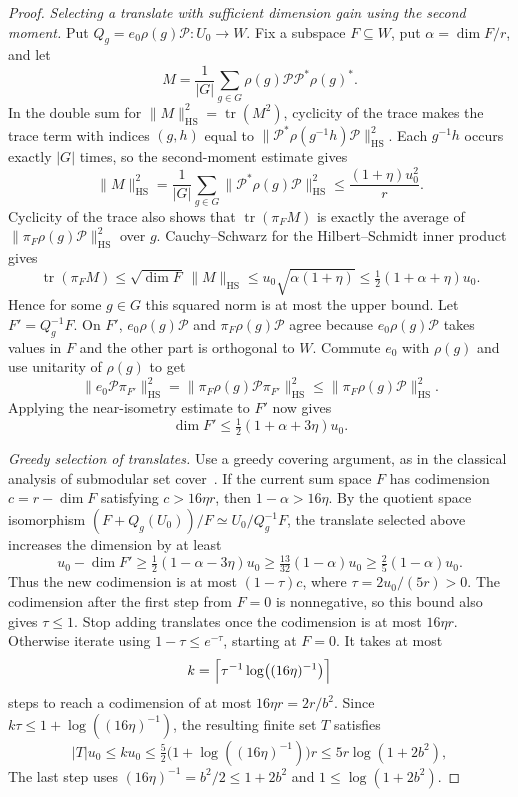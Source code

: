 \begin{proof}
\emph{Selecting a translate with sufficient dimension gain using the second moment.}
Put $Q_g=e_0\rho(g)\mathcal P:U_0\to W$.
Fix a subspace $F\subseteq W$, put $\alpha=\dim F/r$, and let
\[
 M=\frac{1}{|G|}\sum_{g\in G}\rho(g)\mathcal P\mathcal P^*\rho(g)^* .
\]
In the double sum for $\|M\|_{\mathrm{HS}}^2=\operatorname{tr}(M^2)$,
cyclicity of the trace makes the trace term with indices $(g,h)$ equal to
$\|\mathcal P^*\rho(g^{-1}h)\mathcal P\|_{\mathrm{HS}}^2$.
Each $g^{-1}h$ occurs exactly $|G|$ times, so the second-moment estimate gives
\[
 \|M\|_{\mathrm{HS}}^2
 =\frac{1}{|G|}\sum_{g\in G}\|\mathcal P^*\rho(g)\mathcal P\|_{\mathrm{HS}}^2
 \le \frac{(1+\eta)u_0^2}{r}.
\]
Cyclicity of the trace also shows that $\operatorname{tr}(\pi_F M)$ is exactly the average of
$\|\pi_F\rho(g)\mathcal P\|_{\mathrm{HS}}^2$ over $g$.
Cauchy--Schwarz for the Hilbert--Schmidt inner product gives
\[
 \operatorname{tr}(\pi_F M)
 \le \sqrt{\dim F}\,\|M\|_{\mathrm{HS}}
 \le u_0\sqrt{\alpha(1+\eta)}
 \le \tfrac12(1+\alpha+\eta)u_0.
\]
Hence for some $g\in G$ this squared norm is at most the upper bound. Let $F'=Q_g^{-1}F$. On $F'$,
$e_0\rho(g)\mathcal P$ and $\pi_F\rho(g)\mathcal P$ agree
because $e_0\rho(g)\mathcal P$ takes values in $F$ and the other part is orthogonal to $W$.
Commute $e_0$ with $\rho(g)$ and use unitarity of $\rho(g)$ to get
\[
 \|e_0\mathcal P\pi_{F'}\|_{\mathrm{HS}}^2
 =\|\pi_F\rho(g)\mathcal P\pi_{F'}\|_{\mathrm{HS}}^2
 \le\|\pi_F\rho(g)\mathcal P\|_{\mathrm{HS}}^2.
\]
Applying the near-isometry estimate to $F'$ now gives
\[
 \dim F'\le \tfrac12(1+\alpha+3\eta)u_0 .
\]

\emph{Greedy selection of translates.}
Use a greedy covering argument, as in the classical analysis of submodular set cover~\cite{Wolsey1982}. If the current sum space $F$ has codimension $c=r-\dim F$ satisfying $c>16\eta r$,
then $1-\alpha>16\eta$. By the quotient space isomorphism
$(F+Q_g(U_0))/F\simeq U_0/Q_g^{-1}F$, the translate selected above increases the dimension by at least
\[
 u_0-\dim F'\ge \tfrac12(1-\alpha-3\eta)u_0
 \ge \tfrac{13}{32}(1-\alpha)u_0
 \ge \tfrac25(1-\alpha)u_0.
\]
Thus the new codimension is at most $(1-\tau)c$, where $\tau=2u_0/(5r)>0$.
The codimension after the first step from $F=0$ is nonnegative, so this bound also gives $\tau\le1$.
Stop adding translates once the codimension is at most $16\eta r$.
Otherwise iterate using $1-\tau\le e^{-\tau}$, starting at $F=0$. It takes at most
\[
 k=\Bigl\lceil\tau^{-1}\log\bigl((16\eta)^{-1}\bigr)\Bigr\rceil
\]
steps to reach a codimension of at most $16\eta r=2r/b^2$. Since $k\tau\le1+\log((16\eta)^{-1})$,
the resulting finite set $T$ satisfies
\[
 |T|u_0\le ku_0
 \le \tfrac52\bigl(1+\log((16\eta)^{-1})\bigr)r
 \le 5r\log(1+2b^2),
\]
The last step uses $(16\eta)^{-1}=b^2/2\le1+2b^2$ and $1\le\log(1+2b^2)$.


\end{proof}
